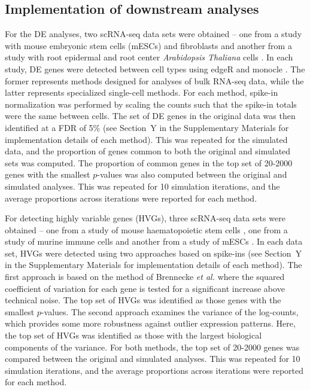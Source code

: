 \documentclass{article}
\begin{document}
\subsection{Implementation of downstream analyses}
For the DE analyses, two scRNA-seq data sets were obtained -- one from a study with mouse embryonic stem cells (mESCs) and fibroblasts \cite{islam2011characterization} and another from a study with root epidermal and root center \textit{Arabidopsis Thaliana} cells \cite{brennecke2013accounting}.
In each study, DE genes were detected between cell types using edgeR \cite{robinson2010edgeR,lund2012detecting} and monocle \cite{trapnell2014dynamics}.
The former represents methods designed for analyses of bulk RNA-seq data, while the latter represents specialized single-cell methods.
For each method, spike-in normalization was performed by scaling the counts such that the spike-in totals were the same between cells.
The set of DE genes in the original data was then identified at a FDR of 5\% (see Section~Y in the Supplementary Materials for implementation details of each method).
This was repeated for the simulated data, and the proportion of genes common to both the original and simulated sets was computed.
The proportion of common genes in the top set of 20-2000 genes with the smallest $p$-values was also computed between the original and simulated analyses.
This was repeated for 10 simulation iterations, and the average proportions across iterations were reported for each method.

For detecting highly variable genes (HVGs), three scRNA-seq data sets were obtained -- one from a study of mouse haematopoietic stem cells \cite{wilson2015combined}, one from a study of murine immune cells \cite{brennecke2013accounting} and another from a study of mESCs \cite{islam2014quantitative}.
In each data set, HVGs were detected using two approaches based on spike-ins (see Section~Y in the Supplementary Materials for implementation details of each method).
The first approach is based on the method of Brennecke \textit{et al.} \cite{brennecke2013accounting} where the squared coefficient of variation for each gene is tested for a significant increase above technical noise.
The top set of HVGs was identified as those genes with the smallest $p$-values.
The second approach examines the variance of the log-counts, which provides some more robustness against outlier expression patterns.
Here, the top set of HVGs was identified as those with the largest biological components of the variance.
For both methods, the top set of 20-2000 genes was compared between the original and simulated analyses.
This was repeated for 10 simulation iterations, and the average proportions across iterations were reported for each method.
\end{document}
